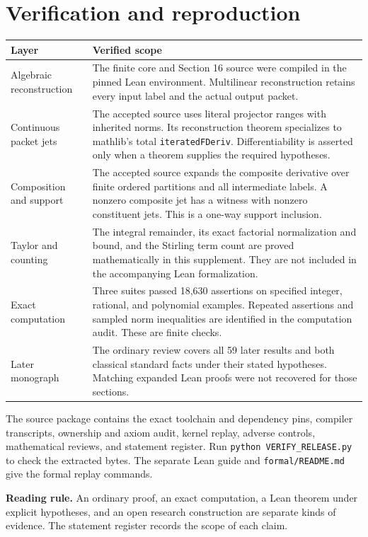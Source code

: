 \documentclass[11pt]{article}
\theoremstyle{remark}\newtheorem{remark}[theorem]{Remark}
\begin{document}
\section{Verification and reproduction}
\begin{longtable}{@{}p{.28\linewidth}p{.64\linewidth}@{}}
\toprule
\textbf{Layer}&\textbf{Verified scope}\\\midrule\endhead
Algebraic reconstruction&The finite core and Section 16 source were compiled in the pinned Lean environment. Multilinear reconstruction retains every input label and the actual output packet.\\
Continuous packet jets&The accepted source uses literal projector ranges with inherited norms. Its reconstruction theorem specializes to mathlib's total \texttt{iteratedFDeriv}. Differentiability is asserted only when a theorem supplies the required hypotheses.\\
Composition and support&The accepted source expands the composite derivative over finite ordered partitions and all intermediate labels. A nonzero composite jet has a witness with nonzero constituent jets. This is a one-way support inclusion.\\
Taylor and counting&The integral remainder, its exact factorial normalization and bound, and the Stirling term count are proved mathematically in this supplement. They are not included in the accompanying Lean formalization.\\
Exact computation&Three suites passed 18,630 assertions on specified integer, rational, and polynomial examples. Repeated assertions and sampled norm inequalities are identified in the computation audit. These are finite checks.\\
Later monograph&The ordinary review covers all 59 later results and both classical standard facts under their stated hypotheses. Matching expanded Lean proofs were not recovered for those sections.\\
\bottomrule
\end{longtable}

The source package contains the exact toolchain and dependency pins, compiler transcripts, ownership and axiom audit, kernel replay, adverse controls, mathematical reviews, and statement register. Run \texttt{python VERIFY\_RELEASE.py} to check the extracted bytes. The separate Lean guide and \texttt{formal/README.md} give the formal replay commands.

\noindent\textbf{Reading rule.} An ordinary proof, an exact computation, a Lean theorem under explicit hypotheses, and an open research construction are separate kinds of evidence. The statement register records the scope of each claim.
\end{document}
